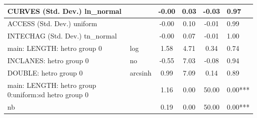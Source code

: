\begin{table}
\begin{center}
\begin{tabular}{|l|l|c|c|c|l|}
			\hline
			CURVES (Std. Dev.) ln_normal &  & -0.00 & 0.03 & -0.03 & 0.97 \\
			\hline
			ACCESS (Std. Dev.) uniform &  & -0.00 & 0.10 & -0.01 & 0.99 \\
			\hline
			INTECHAG (Std. Dev.) tn_normal &  & -0.00 & 0.07 & -0.01 & 1.00 \\
			\hline
			main: LENGTH: hetro group 0 & log & 1.58 & 4.71 & 0.34 & 0.74 \\
			\hline
			INCLANES: hetro group 0 & no & -0.55 & 7.03 & -0.08 & 0.94 \\
			\hline
			DOUBLE: hetro group 0 & arcsinh & 0.99 & 7.09 & 0.14 & 0.89 \\
			\hline
			main: LENGTH: hetro group 0:uniform:sd  hetro group 0 &  & 1.16 & 0.00 & 50.00 & 0.00*** \\
			\hline
			nb &  & 0.19 & 0.00 & 50.00 & 0.00*** \\
			\hline
		\end{tabular}
	\end{center}
\end{table}